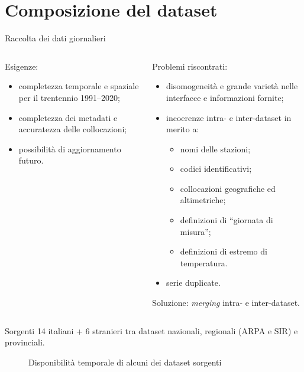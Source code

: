 
\section{Composizione del dataset}
\begin{frame}{Raccolta dei dati giornalieri}
  \begin{columns}
    \begin{column}{0.45\textwidth}
      Esigenze:
      \begin{itemize}
        \item completezza temporale e spaziale per il trentennio 1991--2020;
        \item completezza dei metadati e accuratezza delle collocazioni;
        \item possibilità di aggiornamento futuro.
      \end{itemize}
    \end{column}
    \begin{column}{0.55\textwidth}
      Problemi riscontrati:
      \begin{itemize}
        \item disomogeneità e grande varietà nelle interfacce e informazioni fornite;
        \item incoerenze intra- e inter-dataset in merito a:
          \begin{itemize}
            \item nomi delle stazioni;
            \item codici identificativi;
            \item collocazioni geografiche ed altimetriche;
            \item definizioni di ``giornata di misura'';
            \item definizioni di estremo di temperatura.
          \end{itemize}
        \item serie duplicate.
      \end{itemize}
      Soluzione: \emph{merging} intra- e inter-dataset.
    \end{column}
  \end{columns}
\end{frame}

\begin{frame}[t]{Sorgenti}
  14 italiani + 6 stranieri tra dataset nazionali, regionali (ARPA e SIR) e provinciali.
  \begin{figure}
    \footnotesize
    
    \caption*{Disponibilità temporale di alcuni dei dataset sorgenti}
  \end{figure}
\end{frame}

